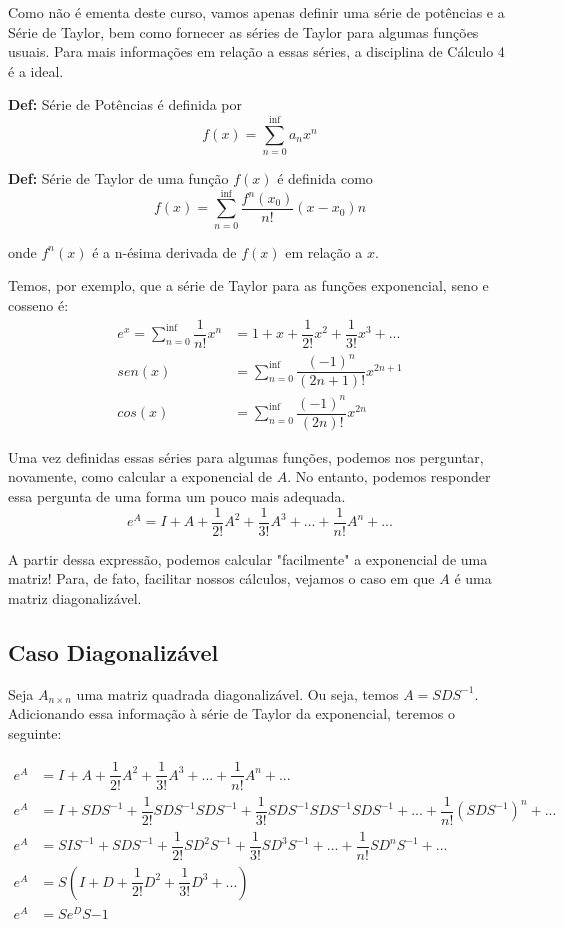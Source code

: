 \documentclass[12pt]{article}
\begin{document}
Como não é ementa deste curso, vamos apenas definir uma série de potências e a Série de Taylor, bem como fornecer as séries de Taylor para algumas funções usuais. Para mais informações em relação a essas séries, a disciplina de Cálculo 4 é a ideal.

\textbf{Def:} Série de Potências é definida por
\begin{equation*}
	f(x)=\sum_{n=0}^{\inf}a_{n}x^n
\end{equation*}

\textbf{Def:} Série de Taylor de uma função $f(x)$ é definida como
\begin{equation*}
	f(x)=\sum_{n=0}^{\inf}\dfrac{f^n(x_0)}{n!}(x-x_0)n
\end{equation*}

onde $f^n(x)$ é a n-ésima derivada de $f(x)$ em relação a $x$.

Temos, por exemplo, que a série de Taylor para as funções exponencial, seno e cosseno é:
\begin{align*}
	e^x=\sum_{n=0}^{\inf}\dfrac{1}{n!}x^n&=1+x+\dfrac{1}{2!}x^2+\dfrac{1}{3!}x^3+...\\
	sen(x)&=\sum_{n=0}^{\inf}\dfrac{(-1)^n}{(2n+1)!}x^{2n+1}\\
	cos(x)&=\sum_{n=0}^{\inf}\dfrac{(-1)^n}{(2n)!}x^{2n}
\end{align*}

Uma vez definidas essas séries para algumas funções, podemos nos perguntar, novamente, como calcular a exponencial de $A$. No entanto, podemos responder essa pergunta de uma forma um pouco mais adequada.
\begin{equation*}
	e^A=I+A+\dfrac{1}{2!}A^2+\dfrac{1}{3!}A^3+...+\dfrac{1}{n!}A^n+...
\end{equation*}

A partir dessa expressão, podemos calcular "facilmente" a exponencial de uma matriz! Para, de fato, facilitar nossos cálculos, vejamos o caso em que $A$ é uma matriz diagonalizável.

\subsection{Caso Diagonalizável}

Seja $A_{n\times n}$ uma matriz quadrada diagonalizável. Ou seja, temos $A=SDS^{-1}$. Adicionando essa informação à série de Taylor da exponencial, teremos o seguinte:

\begin{align*}
	e^A&=I+A+\dfrac{1}{2!}A^2+\dfrac{1}{3!}A^3+...+\dfrac{1}{n!}A^n+...\\
	e^A&=I+SDS^{-1}+\dfrac{1}{2!}SDS^{-1}SDS^{-1}+\dfrac{1}{3!}SDS^{-1}SDS^{-1}SDS^{-1}+...+\dfrac{1}{n!}(SDS^{-1})^n+...\\
	e^A&=SIS^{-1}+SDS^{-1}+\dfrac{1}{2!}SD^2S^{-1}+\dfrac{1}{3!}SD^3S^{-1}+...+\dfrac{1}{n!}SD^nS^{-1}+...\\
	e^A&=S(I+D+\dfrac{1}{2!}D^2+\dfrac{1}{3!}D^3+...)\\
	e^A&=Se^DS{-1}
\end{align*}
\end{document}
